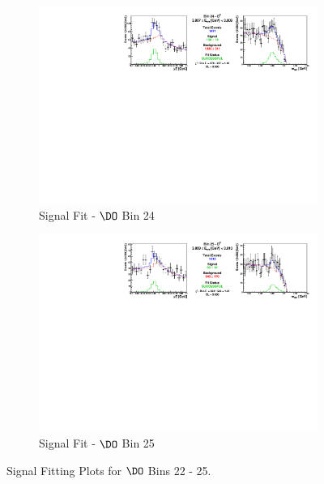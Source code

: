 \begin{figure}[h]
\begin{subfigure}[c]{0.99\textwidth}
\includegraphics[width=\textwidth]{figures/plots/fit_results/D0_bin_24.pdf}
\caption*{Signal Fit - $\DO$ Bin 24}
\end{subfigure}

\vspace{5pt}

\begin{subfigure}[c]{0.99\textwidth}
\includegraphics[width=\textwidth]{figures/plots/fit_results/D0_bin_25.pdf}
\caption*{Signal Fit - $\DO$ Bin 25}
\end{subfigure}

\caption{Signal Fitting Plots for $\DO$ Bins 22 - 25.}
\label{fig:DO_plots_22_25}

\end{figure}


